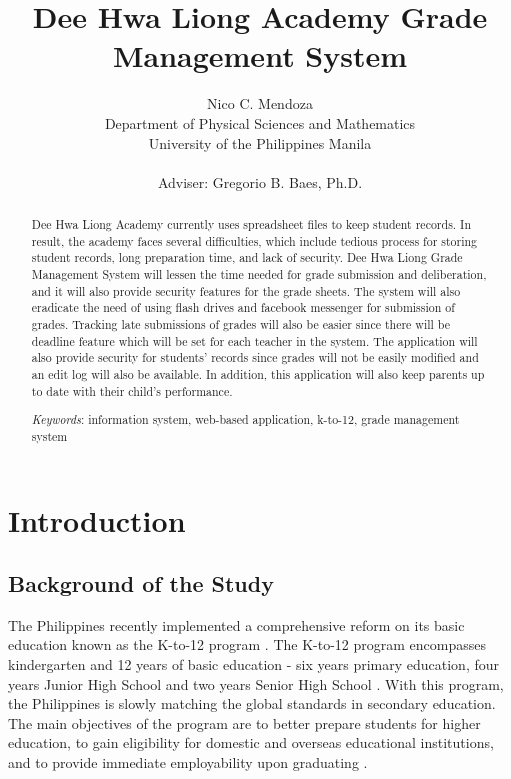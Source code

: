 \documentclass[11pt,a4paper,titlepage]{article}
\title {Dee Hwa Liong Academy Grade Management System}
\author {Nico C. Mendoza \\ Department of Physical Sciences and Mathematics \\ University of the Philippines Manila \\ \\ Adviser: Gregorio B. Baes, Ph.D.
}
\date{}
\let\stdsection\section
\renewcommand\section{\newpage\stdsection}
\newcommand{\Keywords}[1]{\par\noindent 
{\small{\em Keywords\/}: #1}}
\begin{document}
\maketitle
\doublespacing

\begin{abstract}
\thispagestyle{plain}
\setcounter{page}{2}
Dee Hwa Liong Academy currently uses spreadsheet files to keep student records. In result, the academy faces several difficulties, which include tedious process for storing student records, long preparation time, and lack of security. Dee Hwa Liong Grade Management System will lessen the time needed for grade submission and deliberation, and it will also provide security features for the grade sheets. The system will also eradicate the need of using flash drives and facebook messenger for submission of grades. Tracking late submissions of grades will also be easier since there will be deadline feature which will be set for each teacher in the system. The application will also provide security for students' records since grades will not be easily modified and an edit log will also be available. In addition, this application will also keep parents up to date with their child’s performance.
\Keywords{information system, web-based application, k-to-12, grade management system}
\end{abstract}

\setcounter{page}{3}
\setcounter{tocdepth}{3}
\tableofcontents
\newpage

\section{Introduction}
\setcounter{page}{1}
\subsection{Background of the Study}

The Philippines recently implemented a comprehensive reform on its basic education known as the K-to-12 program \cite{Okabe}. The K-to-12 program encompasses kindergarten and 12 years of basic education - six years primary education, four years Junior High School and two years Senior High School \cite{Gazette}. With this program, the Philippines is slowly matching the global standards in secondary education. The main objectives of the program are to better prepare students for higher education, to gain eligibility for domestic and overseas educational institutions, and to provide immediate employability upon graduating \cite{Okabe}.
\end{document}
